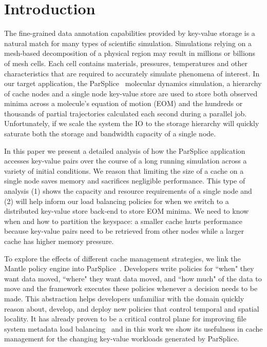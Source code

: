 \section{Introduction}

The fine-grained data annotation capabilities provided by key-value storage is
a natural match for many types of scientific simulation. Simulations relying on
a mesh-based decomposition of a physical region may result in millions or
billions of mesh cells. Each cell contains materials, pressures, temperatures
and other characteristics that are required to accurately simulate phenomena of
interest. In our target application, the
ParSplice~\cite{perez:jctc20150parsplice} molecular dynamics simulation, a
hierarchy of cache nodes and a single node key-value store are used to store
both observed minima across a molecule's equation of motion (EOM) and the
hundreds or thousands of partial trajectories calculated each second during a
parallel job. Unfortunately, if we scale the system the IO to the storage
hierarchy will quickly saturate both the storage and bandwidth capacity of a
single node. 

In this paper we present a detailed analysis of how the ParSplice application
accesses key-value pairs over the course of a long running simulation across a
variety of initial conditions. We reason that limiting the size of a cache on a
single node saves memory and sacrifices negligible performance. This type of
analysis (1) shows the capacity and resource requirements of a single node and
(2) will help inform our load balancing policies for when we switch to a
distributed key-value store back-end to store EOM minima. We need to know when
and how to partition the keyspace: a smaller cache hurts performance because
key-value pairs need to be retrieved from other nodes while a larger cache has
higher memory pressure.

To explore the effects of different cache management strategies, we link the
Mantle policy engine into ParSplice~\cite{perez:jctc20150parsplice}.
Developers write policies for ``when" they want data moved, ``where" they want
data moved, and ``how much" of the data to move and the framework executes
these policies whenever a decision needs to be made.  This abstraction helps
developers unfamiliar with the domain quickly reason about, develop, and deploy
new policies that control temporal and spatial locality.  It has already proven
to be a critical control plane for improving file system metadata load
balancing~\cite{sevilla:sc15-mantle} and in this work we show its usefulness in
cache management for the changing key-value workloads generated by ParSplice. 

